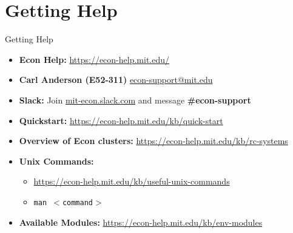 \documentclass{beamer}
\begin{document}

\section{Getting Help}
\begin{frame}{Getting Help}
    \begin{itemize}
        \item \textbf{Econ Help:} \url{https://econ-help.mit.edu/}
        \item \textbf{Carl Anderson (E52-311)} \url{econ-support@mit.edu}
        \item \textbf{Slack:} Join \url{mit-econ.slack.com} and message \textbf{\#econ-support}
        \item \textbf{Quickstart:} \url{https://econ-help.mit.edu/kb/quick-start}
        \item \textbf{Overview of Econ clusters:} \url{https://econ-help.mit.edu/kb/rc-systems}
        \item \textbf{Unix Commands:}
        \begin{itemize}
            \item \url{https://econ-help.mit.edu/kb/useful-unix-commands}
            \item \texttt{man $<$command$>$} 
        \end{itemize}
        \item \textbf{Available Modules:} \url{https://econ-help.mit.edu/kb/env-modules}
    \end{itemize}
\end{frame}
\end{document}

